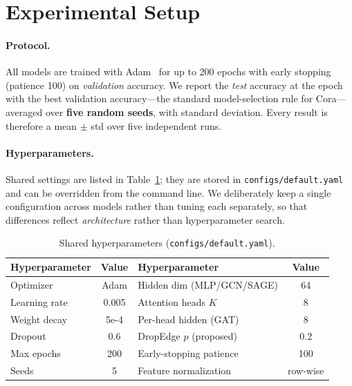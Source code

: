 \documentclass{article}
\begin{document}
\section{Experimental Setup}
\label{sec:setup}

\paragraph{Protocol.} All models are trained with Adam~\cite{kingma2015adam} for up to
200 epochs with early stopping (patience 100) on \emph{validation} accuracy. We report
the \emph{test} accuracy at the epoch with the best validation accuracy---the standard
model-selection rule for Cora---averaged over \textbf{five random seeds}, with standard
deviation. Every result is therefore a mean $\pm$ std over five independent runs.

\paragraph{Hyperparameters.} Shared settings are listed in
Table~\ref{tab:hparams}; they are stored in \texttt{configs/default.yaml} and can be
overridden from the command line. We deliberately keep a single configuration across
models rather than tuning each separately, so that differences reflect
\emph{architecture} rather than hyperparameter search.

\begin{table}[h]
  \centering
  \caption{Shared hyperparameters (\texttt{configs/default.yaml}).}
  \label{tab:hparams}
  \begin{tabular}{lc@{\hskip 2em}lc}
    \toprule
    Hyperparameter & Value & Hyperparameter & Value \\
    \midrule
    Optimizer         & Adam    & Hidden dim (MLP/GCN/SAGE) & 64 \\
    Learning rate     & 0.005   & Attention heads $K$       & 8 \\
    Weight decay      & 5e-4    & Per-head hidden (GAT)     & 8 \\
    Dropout           & 0.6     & DropEdge $p$ (proposed)   & 0.2 \\
    Max epochs        & 200     & Early-stopping patience   & 100 \\
    Seeds             & 5       & Feature normalization     & row-wise \\
    \bottomrule
  \end{tabular}
\end{table}
\end{document}
